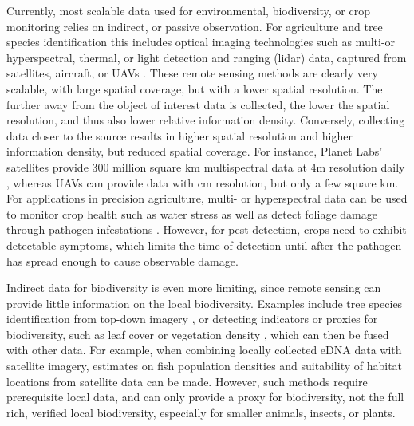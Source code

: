 Currently, most scalable data used for environmental, biodiversity, or crop monitoring relies on indirect, or passive observation. For agriculture and tree species identification this includes optical imaging technologies such as multi-or hyperspectral, thermal, or light detection and ranging (lidar) data, captured from satellites, aircraft, or UAVs \cite{Tsouros2019, Toth2016, Singh2020, Mahlein2018}. 
These remote sensing methods are clearly very scalable, with large spatial coverage, but with a lower spatial resolution. The further away from the object of interest data is collected, the lower the spatial resolution, and thus also lower relative information density. 
Conversely, collecting data closer to the source results in higher spatial resolution and higher information density, but reduced spatial coverage. For instance, Planet Labs' satellites provide 300 million square km multispectral data at 4m resolution daily \cite{Lab}, whereas UAVs can provide data with cm resolution, but only a few square km.
For applications in precision agriculture, multi- or hyperspectral data can be used to monitor crop health such as water stress as well as detect foliage damage through pathogen infestations \cite{Mahlein2018}. However, for pest detection, crops need to exhibit detectable symptoms, which limits the time of detection until after the pathogen has spread enough to cause observable damage. 
 
Indirect data for biodiversity is even more limiting, since remote sensing can provide little information on the local biodiversity. Examples include tree species identification from top-down imagery \cite{Onishi2021, Schiefer2020, Xu2020a}, or detecting indicators or proxies for biodiversity, such as leaf cover or vegetation density \cite{Skidmore2015}, which can then be fused with other data. For example, when combining locally collected eDNA data with satellite imagery, estimates on fish population densities and suitability of habitat locations from satellite data can be made\cite{Zong2024}. However, such methods require prerequisite local data, and can only provide a proxy for biodiversity, not the full rich, verified local biodiversity, especially for smaller animals, insects, or plants.


